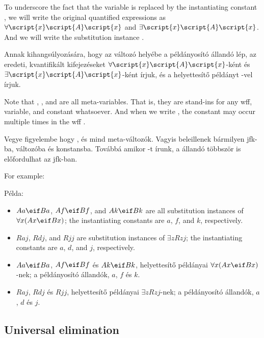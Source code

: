 To underscore the fact that the variable  is replaced by the instantiating constant , we will write the original quantified expressions as $\forall \script{x}\script{A}\script{x}$ and $\exists \script{x}\script{A}\script{x}$. And we will write the substitution instance .

Annak kihangsúlyozására, hogy az  változó helyébe a példányosító  állandó lép, az eredeti, kvantifikált kifejezéseket $\forall \script{x} \script{A} \script{x}$-ként és $\exists \script{x} \script{A} \script {x}$-ként írjuk, és a helyettesítő példányt -vel írjuk.

Note that , , and  are all meta-variables. That is, they are stand-ins for any wff, variable, and constant whatsoever. And when we write , the constant  may occur multiple times in the wff .

Vegye figyelembe hogy ,  és  mind meta-változók. Vagyis beleillenek bármilyen jfk-ba, változóba és konstansba. Továbbá amikor -t írunk, a  állandó többször is előfordulhat az  jfk-ban.


For example:

Példa:

\begin{itemize}
\item $Aa \eif Ba$, $Af \eif Bf$, and $Ak \eif Bk$ are all substitution instances of $\forall x(Ax \eif Bx)$; the instantiating constants are $a$, $f$, and $k$, respectively.
\item $Raj$, $Rdj$, and $Rjj$ are substitution instances of $\exists zRzj$; the instantiating constants are $a$, $d$, and $j$, respectively.
\end{itemize}

\begin{itemize}
\item $Aa \eif Ba$, $Af \eif Bf$ és $Ak \eif Bk$, helyettesítő példányai $\forall x(Ax \eif Bx)$-nek; a példányosító állandók, $a$, $f$ és $k$.
\item $Raj$, $Rdj$ és $Rjj$, helyettesítő példányai $\exists zRzj$-nek; a példányosító állandók, $a$, $d$ és $j$.
\end{itemize}

\subsection*{Universal elimination}
